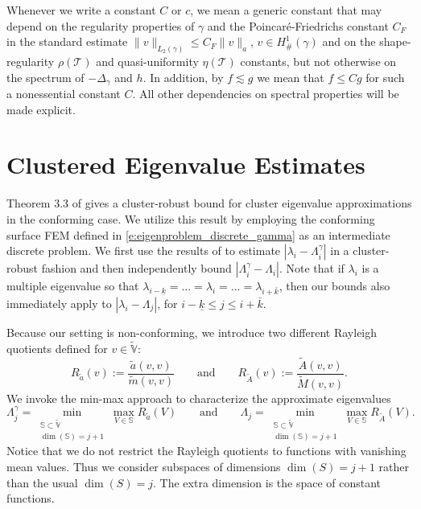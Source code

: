 \documentclass{siamart0516}
\numberwithin{equation}{section}
\numberwithin{theorem}{section}
\numberwithin{figure}{section}
\begin{document}
Whenever we write a constant $C$ or $c$, we mean a generic constant that may depend on the regularity properties of $\gamma$ and the Poincar\'e-Friedrichs constant $C_F$ in the standard estimate $\|v\|_{L_2(\gamma)} \le C_F \|v\|_{a}$, $v \in H^1_\#(\gamma)$ and on the shape-regularity $\rho(\mathcal T)$ and quasi-uniformity $\eta(\mathcal T)$ constants, but not otherwise on the spectrum of $-\Delta_\gamma$ and $h$. In addition, by $f \lesssim g$ we mean that $f \le Cg$ for such a nonessential constant $C$.  All other dependencies on spectral properties will be made explicit.  

\section{Clustered Eigenvalue Estimates} \label{sec3}

 Theorem 3.3 of \cite{KO06} gives a cluster-robust bound for cluster eigenvalue approximations in the conforming case.   We utilize this result by employing the conforming surface FEM defined in \eqref{e:eigenproblem_discrete_gamma} as an intermediate discrete problem.  We first use the results of \cite{KO06} to estimate $|\lambda_i - \Lambda^\gamma_{i}|$ in a cluster-robust fashion and then independently bound $|\Lambda^\gamma_{i}-\Lambda_{i}|$. Note that if $\lambda_i$ is a multiple eigenvalue so that $\lambda_{i-\underline{k}}=...=\lambda_i=...=\lambda_{i+\bar k}$, then our bounds also immediately apply to $|\lambda_i-\Lambda_{j}|$,  for $i-\underline{k} \le j \le i+\bar{k}$.  

Because our setting is non-conforming, we introduce two different Rayleigh quotients defined for $v\in \widetilde{\mathbb V}$:
$$
R_{\tilde a}(v)  := \frac{\tilde a(v,v)}{\tilde m(v,v)} \qquad \textrm{and} \qquad R_{\widetilde A}(v)  := \frac{\widetilde A(v,v)}{\widetilde M(v,v)}.
$$
We invoke the min-max approach to characterize the approximate eigenvalues  
\begin{equation}\label{FcEig}
\Lambda^\gamma_{j}  = \min_{\substack{\mathbb S\subset \widetilde{\mathbb V} \\ \dim(\mathbb S)=j+1}} \max_{V\in \mathbb S} R_{\tilde a}(V) \qquad \text{and} \qquad  \Lambda_{j} = \min_{\substack{\mathbb S\subset \widetilde{\mathbb V}\\ \dim(\mathbb S)=j+1}} \max_{V\in \mathbb S} R_{\widetilde A}(V).
\end{equation}
Notice that we do not restrict the Rayleigh quotients to functions with vanishing mean values.  Thus we consider subspaces of dimensions $\dim(S)=j+1$ rather than the usual $\dim(S)=j$. The extra dimension is the space of constant functions.   
\end{document}

